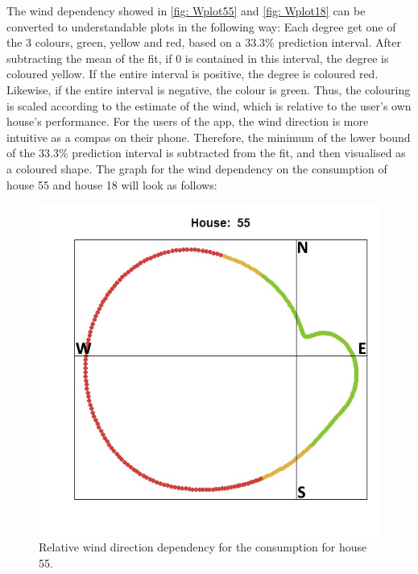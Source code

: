 \noindent The wind dependency showed in \cref{fig: Wplot55} and \cref{fig: Wplot18} can be converted to understandable plots in the following way: Each degree get one of the 3 colours, green, yellow and red, based on a 33.3\% prediction interval.  After subtracting the mean of the fit, if 0 is contained in this interval, the degree is coloured yellow.  If the entire interval is positive, the degree is coloured red.  Likewise, if the entire interval is negative, the colour is green. Thus, the colouring is scaled according to the estimate of the wind, which is relative to the user's own house's performance. For the users of the app, the wind direction is more intuitive as a compas on their phone.  Therefore, the minimum of the lower bound of the 33.3\% prediction interval is subtracted from the fit, and then visualised as a coloured shape. The graph for the wind dependency on the consumption of house 55 and house 18 will look as follows: 
\begin{figure}[ht]
    \centering
    \includegraphics[scale=0.65]{../../../figures/WKplot55.jpeg}
    \caption{Relative wind direction dependency for the consumption for house 55.}
    \label{fig: WKplot55}
\end{figure}
